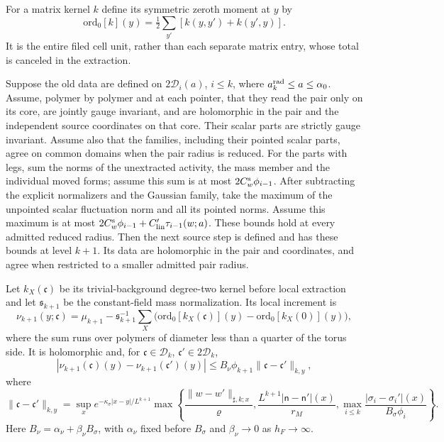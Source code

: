 \documentclass[11pt,letterpaper,reqno]{amsart}
\makeatletter
\theoremstyle{definition}
\newcommand{\ms@minorstart}{%
  \pushQED{\qed}\renewcommand{\qedsymbol}{$\blacksquare$}}
\newenvironment{proposition}[1][]{\ms@minorstart\ms@proposition[#1]}
  {\popQED\endms@proposition}
\theoremstyle{remark}
\makeatother
\begin{document}
For a matrix kernel $k$ define its symmetric zeroth moment at $y$ by
\[
 \mathrm{ord}_0[k](y)=\tfrac12\sum_{y'}[k(y,y')+k(y',y)].
\]
It is the entire filed cell unit, rather than each separate
matrix entry, whose total is canceled in the extraction.

\begin{proposition}[One step at the sources]\label{C-407-16}
Suppose the old data are defined on $2\mathscr D_i(a)$,
$i\le k$, where $a_k^{\rm rad}\le a\le\alpha_0$.
Assume, polymer by polymer and at each pointer, that they read
the pair only on its core, are jointly gauge invariant, and
are holomorphic in the pair and the independent source coordinates
on that core. Their scalar parts are strictly gauge invariant.
Assume also that the families, including their pointed scalar
parts, agree on common domains when the pair radius is reduced.
For the parts with legs, sum the norms of the unextracted
activity, the mass member and the individual moved forms;
assume this sum is at most $2C_w^{\rm s}\phi_{i-1}$.
After subtracting the explicit normalizers and the Gaussian
family, take the maximum of the unpointed scalar fluctuation
norm and all its pointed norms. Assume this maximum is at most
$2C_w^{\rm s}\phi_{i-1}+C'_{\rm lin}\tau_{i-1}(w;a)$.
These bounds hold at every admitted reduced radius.
Then the next source step is defined and has these bounds
at level $k+1$. Its data are holomorphic in the pair and
coordinates, and agree when restricted to a smaller
admitted pair radius.

Let $k_X(\mathfrak c)$ be its trivial-background degree-two
kernel before local extraction and let $\mathfrak s_{k+1}$
be the constant-field mass normalization. Its local increment is
\begin{equation}\label{eq:qcd-source-increment}
 \nu_{k+1}(y;\mathfrak c)=\mu_{k+1}
 -\mathfrak s_{k+1}^{-1}\sum_X
 \bigl(\mathrm{ord}_0[k_X(\mathfrak c)](y)
                 -\mathrm{ord}_0[k_X(0)](y)\bigr),
\end{equation}
where the sum runs over polymers of diameter less than a quarter
of the torus side. It is holomorphic and, for
$\mathfrak c\in\mathscr D_k$, $\mathfrak c'\in2\mathscr D_k$,
\begin{equation}\label{eq:qcd-increment-locality}
 |\nu_{k+1}(\mathfrak c)(y)-\nu_{k+1}(\mathfrak c')(y)|
 \le B_\nu\phi_{k+1}\|\mathfrak c-\mathfrak c'\|_{k,y},
\end{equation}
where
\[
 \|\mathfrak c-\mathfrak c'\|_{k,y}=
 \sup_xe^{-\kappa_\sigma|x-y|/L^{k+1}}
 \max\left\{\frac{\|w-w'\|_{\sharp,k;x}}\varrho,
 \frac{L^{k+1}|\mathsf n-\mathsf n'|(x)}{r_M},
 \max_{i\le k}\frac{|\sigma_i-\sigma_i'|(x)}{B_\sigma\phi_i}\right\}.
\]
Here $B_\nu=\alpha_\nu+\beta_\nu B_\sigma$, with
$\alpha_\nu$ fixed before $B_\sigma$ and $\beta_\nu\to0$
as $h_F\to\infty$.
\end{proposition}
\end{document}
